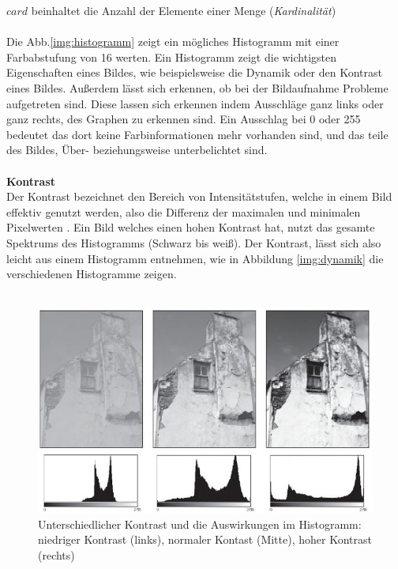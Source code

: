 \documentclass[a4paper,12pt,oneside]{article}
\begin{document}
  $card$ beinhaltet die Anzahl der Elemente einer Menge (\textit{Kardinalität})\\\\
  Die Abb.\ref{img:histogramm} zeigt ein mögliches Histogramm mit einer Farbabstufung von 16 werten. Ein Histogramm zeigt die wichtigsten Eigenschaften eines Bildes, wie beispielsweise die Dynamik oder den Kontrast eines Bildes. Außerdem lässt sich erkennen, ob bei der Bildaufnahme Probleme aufgetreten sind. Diese lassen sich erkennen indem Ausschläge ganz links oder ganz rechts, des Graphen zu erkennen sind. Ein Ausschlag bei 0 oder 255 bedeutet das dort keine Farbinformationen mehr vorhanden sind, und das teile des Bildes, Über- beziehungsweise unterbelichtet sind.\\\\
  \textbf{Kontrast}\label{s.kontrast}\\
  Der Kontrast bezeichnet den Bereich von Intensitätstufen, welche in einem Bild effektiv genutzt werden, also die Differenz der maximalen und minimalen Pixelwerten \cite[44]{burger2009digitale}. Ein Bild welches einen hohen Kontrast hat, nutzt das gesamte Spektrums des Histogramms (Schwarz bis weiß). Der Kontrast, lässt sich also leicht aus einem Histogramm entnehmen, wie in Abbildung \ref{img:dynamik} die verschiedenen Histogramme zeigen.\\\\
  \begin{figure}
    [h]
    \centering
    \includegraphics[scale=0.7]{Sources/kontrast.JPG}
    \caption{Unterschiedlicher Kontrast und die Auswirkungen im Histogramm: niedriger Kontrast (links), normaler Kontast (Mitte), hoher Kontrast (rechts)\cite[45]{burger2009digitale}}
    \label{img:kontrast}
  \end{figure}\\
\end{document}
